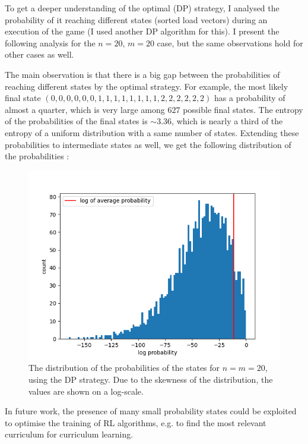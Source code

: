 To get a deeper understanding of the optimal (DP) strategy, I analysed the probability of it reaching different states (sorted load vectors) during an execution of the game (I used another DP algorithm for this). I present the following analysis for the $n=20$, $m=20$ case, but the same observations hold for other cases as well.

The main observation is that there is a big gap between the probabilities of reaching different states by the optimal strategy. For example, the most likely final state $(0, 0, 0, 0, 0, 0, 1, 1, 1, 1, 1, 1, 1, 1, 2, 2, 2, 2, 2, 2)$ has a probability of almost a quarter, which is very large among $627$ possible final states. The entropy of the probabilities of the final states is $\sim 3.36$, which is nearly a third of the entropy of a uniform distribution with a same number of states. Extending these probabilities to intermediate states as well, we get the following distribution of the probabilities :



\begin{figure}[h!] \label{two-thinning-state-distribution}
    \centering
    \includegraphics[scale=1.0]{Chapter4/Figs/state_distribution_20_20_all_log_count.png}
    \caption{The distribution of the probabilities of the states for $n=m=20$, using the DP strategy. Due to the skewness of the distribution, the values are shown on a log-scale.}
\end{figure}


In future work, the presence of many small probability states could be exploited to optimise the training of RL algorithms, e.g. to find the most relevant curriculum for curriculum learning. 


